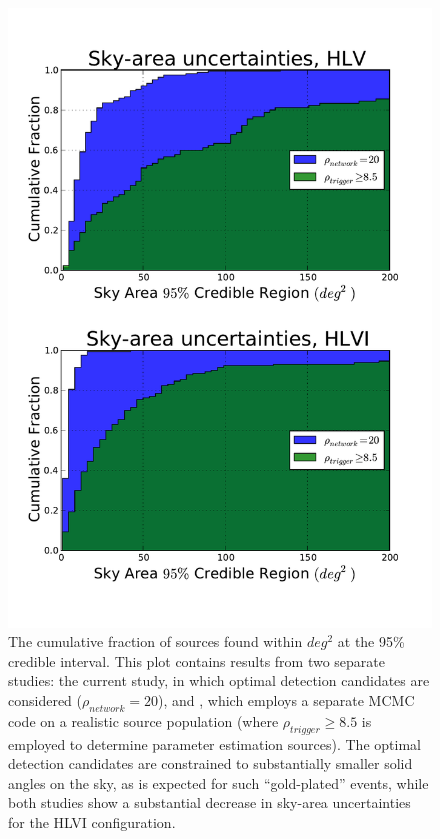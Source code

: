 \documentclass[11pt,a4paper]{emulateapj} 
\begin{document}
\begin{figure}[ht!]
  \centering \includegraphics[angle=0,scale=0.58, trim=0.5cm 1cm 0cm 0cm]{comparitiveSkyAreas.pdf}
  
 \caption{The cumulative fraction of sources found within $deg^2$ at the 95\% credible
 interval.  This plot contains results from two separate studies: the current study, in
 which optimal detection candidates are considered ($\rho_{network}=20$), 
and \cite{Nissanke2013}, which employs a separate MCMC code on a
 realistic source population (where $\rho_{trigger} \geq 8.5$ is employed to determine
 parameter estimation sources).  The optimal detection candidates are constrained
 to substantially smaller solid angles on the sky, as is expected for such ``gold-plated''
 events, while both studies show a substantial decrease in sky-area uncertainties for the HLVI configuration.}
 \label{compSky}
\end{figure}
\end{document}
